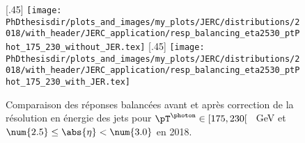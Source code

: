 \begin{figure}[h]
\centering
{}[.45\textwidth]
{\texttt{[image: \\PhDthesisdir/plots\_and\_images/my\_plots/JERC/distributions/2018/with\_header/JERC\_application/resp\_balancing\_eta2530\_ptPhot\_175\_230\_without\_JER.tex]}}
\hfill
{}[.45\textwidth]
{\texttt{[image: \\PhDthesisdir/plots\_and\_images/my\_plots/JERC/distributions/2018/with\_header/JERC\_application/resp\_balancing\_eta2530\_ptPhot\_175\_230\_with\_JER.tex]}}
\caption[Réponses balancées avant et après correction de la résolution en énergie des jets.]{Comparaison des réponses balancées avant et après correction de la résolution en énergie des jets pour $\pT^{\photon}\in[175, 230[$ \SI{}{\GeV} et $\num{2.5}\leq\abs{\eta}<\num{3.0}$ en 2018.}
\label{fig-distrib_Gjets_18_resp_balancing_eta2530_ptPhot_175_230_only_L2Res_JER_application}
\end{figure}